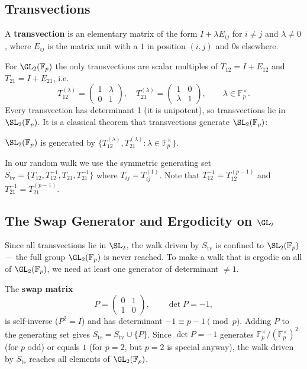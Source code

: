 \subsection{Transvections}

\begin{definition}[Transvection]
A \textbf{transvection} is an elementary matrix of the form $I + \lambda E_{ij}$
for $i \neq j$ and $\lambda \neq 0$, where $E_{ij}$ is the matrix unit with a
$1$ in position $(i,j)$ and $0$s elsewhere.
\end{definition}

For $\GL_2(\mathbb{F}_p)$ the only transvections are scalar multiples of
$T_{12} = I + E_{12}$ and $T_{21} = I + E_{21}$, i.e.
\[
  T_{12}^{(\lambda)} = \begin{pmatrix} 1 & \lambda \\ 0 & 1 \end{pmatrix}, \quad
  T_{21}^{(\lambda)} = \begin{pmatrix} 1 & 0 \\ \lambda & 1 \end{pmatrix},
  \qquad \lambda \in \mathbb{F}_p^\times.
\]
Every transvection has determinant 1 (it is unipotent), so transvections lie in
$\SL_2(\mathbb{F}_p)$.
It is a classical theorem that transvections generate $\SL_2(\mathbb{F}_p)$:

\begin{theorem}
$\SL_2(\mathbb{F}_p)$ is generated by $\{T_{12}^{(\lambda)}, T_{21}^{(\lambda)} : \lambda \in \mathbb{F}_p^\times\}$.
\end{theorem}

In our random walk we use the symmetric generating set
$S_{\mathrm{tv}} = \{T_{12}, T_{12}^{-1}, T_{21}, T_{21}^{-1}\}$
where $T_{ij} = T_{ij}^{(1)}$.
Note that $T_{12}^{-1} = T_{12}^{(p-1)}$ and $T_{21}^{-1} = T_{21}^{(p-1)}$.

\subsection{The Swap Generator and Ergodicity on $\GL_2$}

Since all transvections lie in $\SL_2$, the walk driven by $S_{\mathrm{tv}}$
is confined to $\SL_2(\mathbb{F}_p)$ — the full group $\GL_2(\mathbb{F}_p)$ is
never reached.
To make a walk that is ergodic on all of $\GL_2(\mathbb{F}_p)$, we need at
least one generator of determinant $\neq 1$.

The \textbf{swap matrix}
\[
  P = \begin{pmatrix} 0 & 1 \\ 1 & 0 \end{pmatrix}, \qquad \det P = -1,
\]
is self-inverse ($P^2 = I$) and has determinant $-1 \equiv p - 1 \pmod{p}$.
Adding $P$ to the generating set gives
$S_{\mathrm{ts}} = S_{\mathrm{tv}} \cup \{P\}$.
Since $\det P = -1$ generates $\mathbb{F}_p^\times / (\mathbb{F}_p^\times)^2$
(for $p$ odd) or equals $1$ (for $p = 2$, but $p = 2$ is special anyway),
the walk driven by $S_{\mathrm{ts}}$ reaches all elements of $\GL_2(\mathbb{F}_p)$.

